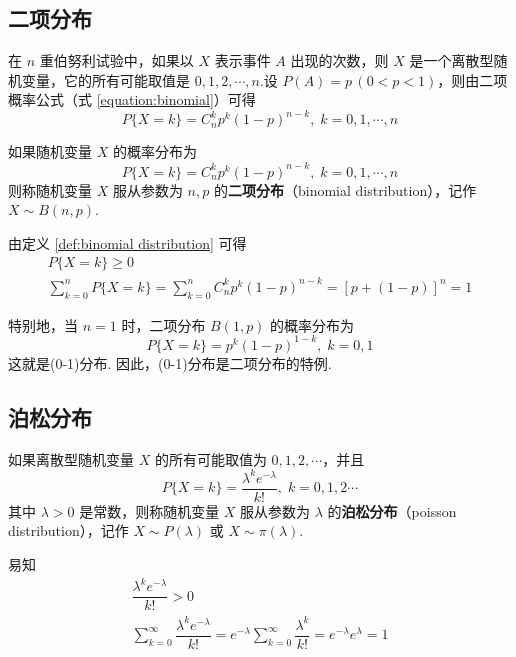 \subsection{二项分布}

在 $n$ 重伯努利试验中，如果以 $X$ 表示事件 $A$ 出现的次数，则 $X$ 是一个离散型随机变量，它的所有可能取值是 $0,1,2,\cdots,n$.设 $P(A)=p\,(0<p<1)$，则由二项概率公式（式 \eqref{equation:binomial}）可得
$$
P\{X=k\}=C_n^k p^k (1-p)^{n-k}, \; k=0,1,\cdots,n
$$

\begin{definition} \label{def:binomial distribution}
    如果随机变量 $X$ 的概率分布为
    $$
    P\{X=k\}=C_n^k p^k (1-p)^{n-k}, \; k=0,1,\cdots,n
    $$
    则称随机变量 $X$ 服从参数为 $n,p$ 的\textbf{二项分布}（binomial distribution），记作 $X \sim B(n,p)$.
\end{definition}

由定义 \ref{def:binomial distribution} 可得
\begin{gather*}
    P\{X=k\} \geqslant 0\\
    \sum_{k=0}^n P\{X=k\} = \sum_{k=0}^n C_n^k p^k (1-p)^{n-k} = [p+(1-p)]^n=1
\end{gather*}

特别地，当 $n=1$ 时，二项分布 $B(1,p)$ 的概率分布为
$$
P\{X=k\} = p^k (1-p)^{1-k}, \; k=0,1
$$
这就是(0-1)分布. 因此，(0-1)分布是二项分布的特例.

\subsection{泊松分布}

\begin{definition}
    如果离散型随机变量 $X$ 的所有可能取值为 $0,1,2,\cdots$，并且
    $$
    P\{X=k\} = \dfrac{\lambda^k e^{-\lambda}}{k!}, \; k=0,1,2\cdots
    $$
    其中 $\lambda > 0$ 是常数，则称随机变量 $X$ 服从参数为 $\lambda$ 的\textbf{泊松分布}（poisson distribution），记作 $X \sim P(\lambda)$ 或 $X \sim \pi(\lambda)$.
\end{definition}

易知
\begin{gather*}
    \dfrac{\lambda^k e^{-\lambda}}{k!} > 0\\
    \sum_{k=0}^\infty \dfrac{\lambda^k e^{-\lambda}}{k!} = e^{-\lambda} \sum_{k=0}^\infty \dfrac{\lambda^k}{k!} = e^{-\lambda} e^{\lambda}=1
\end{gather*}

